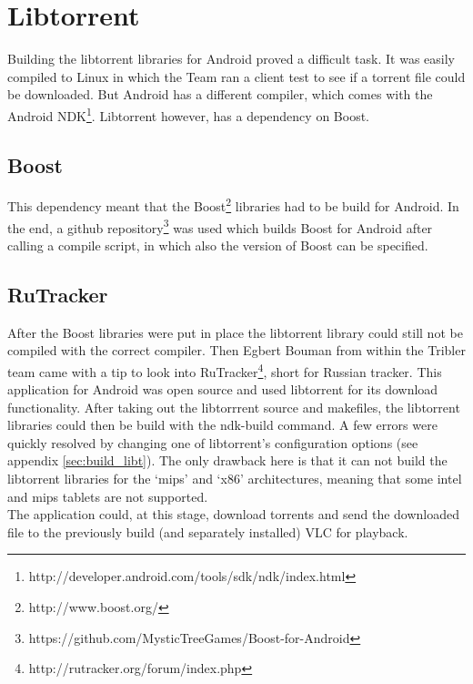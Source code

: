 \section{Libtorrent}
\thispagestyle{fancy}
\label{sec:libtorrent_impl}
Building the libtorrent libraries for Android proved a difficult task. It was easily compiled to Linux in which the Team ran a client test to see if a torrent file could be downloaded. But Android has a different compiler, which comes with the Android NDK\footnote{http://developer.android.com/tools/sdk/ndk/index.html}. Libtorrent however, has a dependency on Boost.

\subsection{Boost}
This dependency meant that the Boost\footnote{http://www.boost.org/} libraries had to be build for Android. In the end, a github repository\footnote{https://github.com/MysticTreeGames/Boost-for-Android} was used which builds Boost for Android after calling a compile script, in which also the version of Boost can be specified.

\subsection{RuTracker}
After the Boost libraries were put in place the libtorrent library could still not be compiled with the correct compiler. Then Egbert Bouman from within the Tribler team came with a tip to look into RuTracker\footnote{http://rutracker.org/forum/index.php}, short for Russian tracker. This application for Android was open source and used libtorrent for its download functionality. After taking out the libtorrrent source and makefiles, the libtorrent libraries could then be build with the ndk-build command. A few errors were quickly resolved by changing one of libtorrent's configuration options (see appendix \ref{sec:build_libt}). The only drawback here is that it can not build the libtorrent libraries for the `mips' and `x86' architectures, meaning that some intel and mips tablets are not supported.\\ 

The application could, at this stage, download torrents and send the downloaded file to the previously build (and separately installed) VLC for playback.
